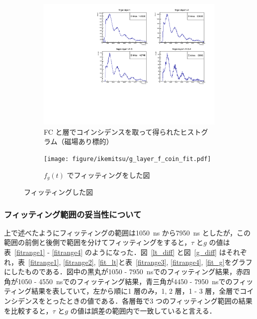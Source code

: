 \begin{figure}[H]
\centering
\begin{subfigure}{\columnwidth}
\centering
\includegraphics[height = 0.9\columnwidth , angle = -90]{figure/ikemitsu/g_layer_f_coin.pdf}
\caption{FC と層でコインシデンスを取って得られたヒストグラム（磁場あり標的）}
\label{g_layercoin}
\end{subfigure}
\begin{subfigure}{\columnwidth}
\centering
\texttt{[image: figure/ikemitsu/g\_layer\_f\_coin\_fit.pdf]}
\caption{$f_{g}(t)$ でフィッティングをした図}
\label{g_layercoin_fit}
\end{subfigure}
\caption{フィッティングした図}
\label{g_layercoin_all}
\end{figure}

\subsubsection{フィッティング範囲の妥当性について}
上で述べたようにフィッティングの範囲は1050~ns から7950~ns としたが，この範囲の前側と後側で範囲を分けてフィッティングをすると，$\tau$ と$g$ の値は表~\ref{fitrange1} - \ref{fitrange4} のようになった．図~\ref{lt_diff} と図~\ref{g_diff} はそれぞれ，表~\ref{fitrange1}, \ref{fitrange2}, \ref{fit_lt}と表~\ref{fitrange3}, \ref{fitrange4}, \ref{fit_g}をグラフにしたものである．図中の黒丸が1050 - 7950~nsでのフィッティング結果，赤四角が1050 - 4550~nsでのフィッティング結果，青三角が4450 - 7950~nsでのフィッティング結果を表していて，左から順に1 層のみ，1, 2 層，1 - 3 層，全層でコインシデンスをとったときの値である．各層毎で3 つのフィッティング範囲の結果を比較すると，$\tau$ と$g$ の値は誤差の範囲内で一致していると言える．
  
